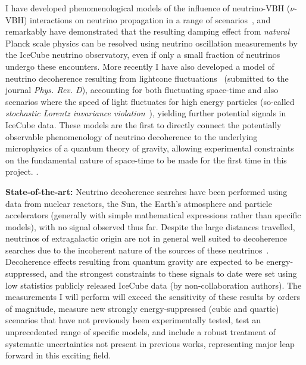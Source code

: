 \documentclass[a4paper,11pt]{article}
\begin{document}
I have developed phenomenological models of the influence of neutrino-VBH ($\nu$-VBH) interactions on neutrino propagation in a range of scenarios~\cite{PhysRevD.102.115003}, and remarkably have demonstrated that the resulting damping effect from \textit{natural} Planck scale physics can be resolved using neutrino oscillation measurements by the IceCube neutrino observatory, even if only a small fraction of neutrinos undergo these encounters. More recently I have also developed a model of neutrino decoherence resulting from lightcone fluctuations~\cite{2103.15313} (submitted to the journal \textit{Phys. Rev. D}), accounting for both fluctuating space-time and also scenarios where the speed of light fluctuates for high energy particles (so-called \textit{stochastic Lorentz invariance violation}~\cite{Vasileiou2015}), yielding further potential signals in IceCube data. These models are the first to directly connect the potentially observable phenomenology of neutrino decoherence to the underlying microphysics of a quantum theory of gravity, allowing experimental constraints on the fundamental nature of space-time to be made for the first time in this project. .

\textbf{State-of-the-art:} Neutrino decoherence searches have been performed using data from nuclear reactors, the Sun, the Earth's atmosphere and particle accelerators (generally with simple mathematical expressions rather than specific models), with no signal observed thus far. Despite the large distances travelled, neutrinos of extragalactic origin are not in general well suited to decoherence searches due to the incoherent nature of the sources of these neutrinos~\cite{PhysRevD.102.115003}. Decoherence effects resulting from quantum gravity are expected to be energy-suppressed, and the strongest constraints to these signals to date were set using low statistics publicly released IceCube data (by non-collaboration authors). The measurements I will perform will exceed the sensitivity of these results by orders of magnitude, measure new strongly energy-suppressed (cubic and quartic) scenarios that have not previously been experimentally tested, test an unprecedented range of specific models, and include a robust treatment of systematic uncertainties not present in previous works, representing  major leap forward in this exciting field. \\


\end{document}
